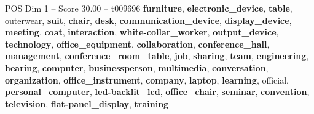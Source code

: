 \begin{textsample}{POS Dim 1 – Score 30.00 – t009696}  \label{ex:f1_pos_016}
\textbf{furniture}, \textbf{electronic\_device}, \textbf{table}, outerwear, \textbf{suit}, \textbf{chair}, \textbf{desk}, \textbf{communication\_device}, \textbf{display\_device}, \textbf{meeting}, \textbf{coat}, \textbf{interaction}, \textbf{white-collar\_worker}, \textbf{output\_device}, \textbf{technology}, \textbf{office\_equipment}, \textbf{collaboration}, \textbf{conference\_hall}, \textbf{management}, \textbf{conference\_room\_table}, \textbf{job}, \textbf{sharing}, \textbf{team}, \textbf{engineering}, \textbf{hearing}, \textbf{computer}, \textbf{businessperson}, \textbf{multimedia}, \textbf{conversation}, \textbf{organization}, \textbf{office\_instrument}, \textbf{company}, \textbf{laptop}, \textbf{learning}, official, \textbf{personal\_computer}, \textbf{led-backlit\_lcd}, \textbf{office\_chair}, \textbf{seminar}, \textbf{convention}, \textbf{television}, \textbf{flat-panel\_display}, \textbf{training}

\end{textsample}
